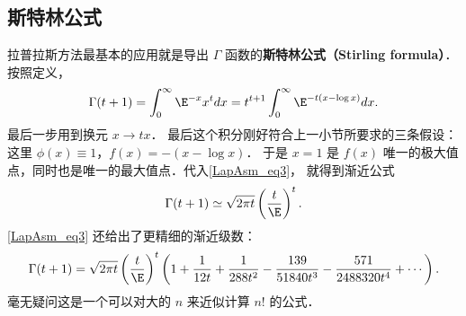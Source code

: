 \subsection{斯特林公式}
拉普拉斯方法最基本的应用就是导出 $\Gamma$ 函数的\textbf{斯特林公式（Stirling formula）}． 按照定义，
$$
\Gamma(t+1)
=\int_0^\infty \E^{-x}x^tdx
=t^{t+1}\int_0^\infty \E^{-t(x-\log x)}dx.
$$
最后一步用到换元 $x\to tx$． 最后这个积分刚好符合上一小节所要求的三条假设：这里 $\phi(x)\equiv1$，$f(x)=-(x-\log x)$． 于是 $x=1$ 是 $f(x)$ 唯一的极大值点，同时也是唯一的最大值点．代入\autoref{LapAsm_eq3}， 就得到渐近公式
$$
\Gamma(t+1)\simeq\sqrt{2\pi t}\left(\frac{t}{\E}\right)^t.
$$
\autoref{LapAsm_eq3} 还给出了更精细的渐近级数：
$$
  \Gamma(t+1)
  =\sqrt{2\pi t}\left({t\over \E}\right)^t
  \left(
   1
   +{1\over12t}
   +{1\over288t^2}
   -{139\over51840t^3}
   -{571\over2488320t^4}
   + \cdots
  \right).
$$
毫无疑问这是一个可以对大的 $n$ 来近似计算 $n!$ 的公式．
